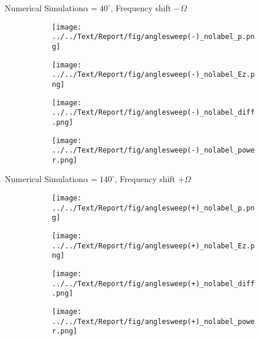 \documentclass[11pt, final]{beamer}
\begin{document}
	\begin{frame}{Numerical Simulation}{$\alpha = 40^\circ$, Frequency shift $-\Omega$}
		\begin{figure}
			\centering
			\begin{subfigure}{0.5\textheight}
				\texttt{[image: ../../Text/Report/fig/anglesweep(-)\_nolabel\_p.png]}
			\end{subfigure}
			\begin{subfigure}{0.5\textheight}
				\texttt{[image: ../../Text/Report/fig/anglesweep(-)\_nolabel\_Ez.png]}
			\end{subfigure}
			\begin{subfigure}{0.5\textheight}
				\texttt{[image: ../../Text/Report/fig/anglesweep(-)\_nolabel\_diff.png]}
			\end{subfigure}
			\begin{subfigure}{0.5\textheight}
				\texttt{[image: ../../Text/Report/fig/anglesweep(-)\_nolabel\_power.png]}
			\end{subfigure}
		\end{figure}
	\end{frame}
	
	\begin{frame}{Numerical Simulation}{$\alpha = 140^\circ$, Frequency shift $+\Omega$}
		\begin{figure}
			\centering
			\begin{subfigure}{0.5\textheight}
				\texttt{[image: ../../Text/Report/fig/anglesweep(+)\_nolabel\_p.png]}
			\end{subfigure}
			\begin{subfigure}{0.5\textheight}
				\texttt{[image: ../../Text/Report/fig/anglesweep(+)\_nolabel\_Ez.png]}
			\end{subfigure}
			\begin{subfigure}{0.5\textheight}
				\texttt{[image: ../../Text/Report/fig/anglesweep(+)\_nolabel\_diff.png]}
			\end{subfigure}
			\begin{subfigure}{0.5\textheight}
				\texttt{[image: ../../Text/Report/fig/anglesweep(+)\_nolabel\_power.png]}
			\end{subfigure}
		\end{figure}
	\end{frame}
	
\end{document}

